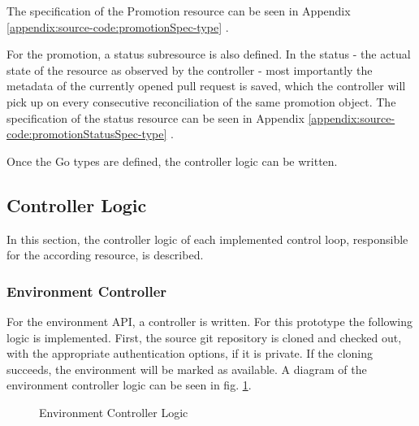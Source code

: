 The specification of the Promotion resource can be seen in Appendix
\ref{appendix:source-code:promotionSpec-type} .

For the promotion,
a status subresource is also defined.
In the status - the actual state of the resource as observed by the controller -
most importantly the metadata of the currently opened pull request is saved,
which the controller will pick up on every consecutive reconciliation
of the same promotion object.
The specification of the status resource can be seen in Appendix
\ref{appendix:source-code:promotionStatusSpec-type} .


Once the Go types are defined,
the controller logic can be written.

\subsection{Controller Logic}
\label{prototype:design:controller-logic}

In this section,
the controller logic of each implemented control loop, responsible for the according resource,
is described.

\subsubsection*{Environment Controller}

For the environment API,
a controller is written.
For this prototype the following logic is implemented.
First, the source git repository is cloned and checked out,
with the appropriate authentication options, if it is private.
If the cloning succeeds, the environment will be marked as available.
A diagram of the environment controller logic can be seen in fig. \ref{tikz:environment-controller-logic}.

\begin{figure}[h]
\centering
{}
\caption{Environment Controller Logic} \label{tikz:environment-controller-logic}
\end{figure}

